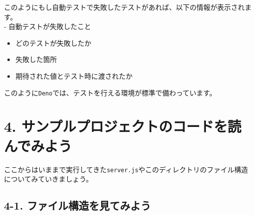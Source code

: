 \begin{Shaded}
\begin{Highlighting}[]







\NormalTok{        \^{}}




\end{Highlighting}
\end{Shaded}

このようにもし自動テストで失敗したテストがあれば、以下の情報が表示されます。\\
- 自動テストが失敗したこと

\begin{itemize}
\item
  どのテストが失敗したか
\item
  失敗した箇所
\item
  期待された値とテスト時に渡されたか
\end{itemize}

このように\texttt{Deno}では、テストを行える環境が標準で備わっています。

\section{4.
サンプルプロジェクトのコードを読んでみよう}\label{ux30b5ux30f3ux30d7ux30ebux30d7ux30edux30b8ux30a7ux30afux30c8ux306eux30b3ux30fcux30c9ux3092ux8aadux3093ux3067ux307fux3088ux3046}

ここからはいままで実行してきた\texttt{server.js}やこのディレクトリのファイル構造についてみていきましょう。

\subsection{4-1.
ファイル構造を見てみよう}\label{ux30d5ux30a1ux30a4ux30ebux69cbux9020ux3092ux898bux3066ux307fux3088ux3046}

